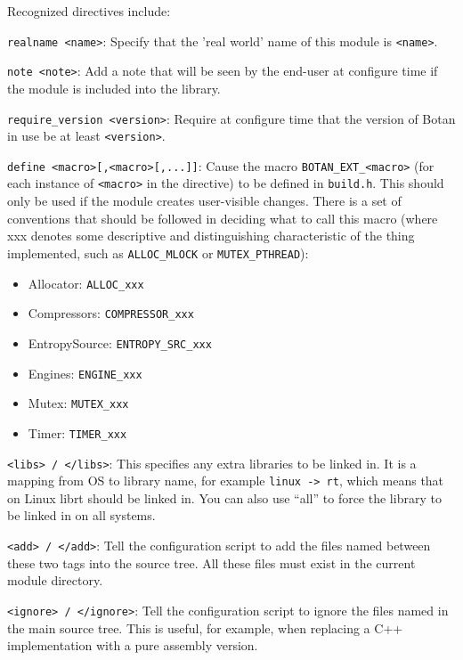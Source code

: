 \documentclass{article}
\newcommand{\filename}[1]{\texttt{#1}}
\newcommand{\macro}[1]{\texttt{#1}}
\begin{document}
Recognized directives include:

\newcommand{\directive}[2]{
   \vskip 4pt
   \noindent
   \texttt{#1}: #2
}

\directive{realname <name>}{Specify that the 'real world' name of this module
   is \texttt{<name>}.}

\directive{note <note>}{Add a note that will be seen by the end-user at
configure time if the module is included into the library.}

\directive{require\_version <version>}{Require at configure time that
the version of Botan in use be at least \texttt{<version>}.}

\directive{define <macro>[,<macro>[,...]]}{Cause the macro
   \macro{BOTAN\_EXT\_<macro>} (for each instance of \macro{<macro>}
   in the directive) to be defined in \filename{build.h}. This should
   only be used if the module creates user-visible changes. There is a
   set of conventions that should be followed in deciding what to call
   this macro (where xxx denotes some descriptive and distinguishing
   characteristic of the thing implemented, such as
   \macro{ALLOC\_MLOCK} or \macro{MUTEX\_PTHREAD}):

\begin{itemize}
\item Allocator: \macro{ALLOC\_xxx}
\item Compressors: \macro{COMPRESSOR\_xxx}
\item EntropySource: \macro{ENTROPY\_SRC\_xxx}
\item Engines: \macro{ENGINE\_xxx}
\item Mutex: \macro{MUTEX\_xxx}
\item Timer: \macro{TIMER\_xxx}
\end{itemize}
}

\directive{<libs> / </libs>}{This specifies any extra libraries to be
linked in.  It is a mapping from OS to library name, for example
\texttt{linux -> rt}, which means that on Linux librt should be linked
in. You can also use ``all'' to force the library to be linked in on
all systems.}

\directive{<add> / </add>}{Tell the configuration script to add the
   files named between these two tags into the source tree. All these
   files must exist in the current module directory.}

\directive{<ignore> / </ignore>}{Tell the configuration script to
   ignore the files named in the main source tree. This is useful, for
   example, when replacing a C++ implementation with a pure assembly
   version.}
\end{document}
